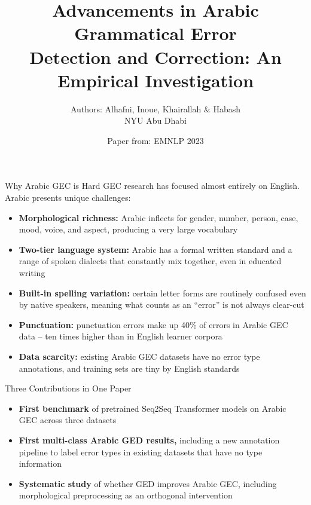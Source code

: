 \documentclass[aspectratio=169]{beamer}
\title{Advancements in Arabic Grammatical Error\\
Detection and Correction: An Empirical Investigation}
\author{Authors: Alhafni, Inoue, Khairallah \& Habash \\ \small NYU Abu Dhabi}
\date{Paper from: EMNLP 2023}
\begin{document}

\begin{frame}
  \titlepage
\end{frame}


\begin{frame}{Why Arabic GEC is Hard}
  GEC research has focused almost entirely on English.
  Arabic presents unique challenges:

  \begin{itemize}
    \item \textbf{Morphological richness:} Arabic inflects for gender, number,
      person, case, mood, voice, and aspect, producing a very large vocabulary
 \item \textbf{Two-tier language system:} Arabic has a formal written
  standard and a range of spoken dialects that constantly mix together,
  even in educated writing
\item \textbf{Built-in spelling variation:} certain letter forms are
  routinely confused even by native speakers, meaning what counts as
  an ``error'' is not always clear-cut
    \item \textbf{Punctuation:} punctuation errors make up 40\% of errors in
      Arabic GEC data -- ten times higher than in English learner corpora
    \item \textbf{Data scarcity:} existing Arabic GEC datasets have no
      error type annotations, and training sets are tiny by English standards
  \end{itemize}
\end{frame}

\begin{frame}{Three Contributions in One Paper}
  \begin{itemize}
    \item \textbf{First benchmark} of pretrained Seq2Seq Transformer models
      on Arabic GEC across three datasets\\[1em]
    \item \textbf{First multi-class Arabic GED results,} including a new
      annotation pipeline to label error types in existing datasets
      that have no type information\\[1em]
    \item \textbf{Systematic study} of whether GED improves Arabic GEC,
      including morphological preprocessing as an orthogonal intervention
  \end{itemize}
\end{frame}
\end{document}
